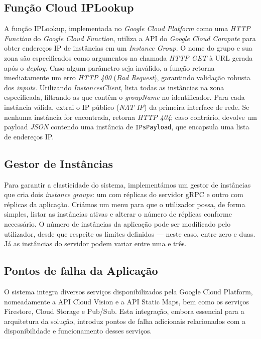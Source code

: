 \subsection{Função Cloud IPLookup}
\label{ssec:cloud_function_iplookup}
A função IPLookup, implementada no \textit{Google Cloud Platform} como uma \textit{HTTP Function} do \textit{Google Cloud Function}, utiliza a API do \textit{Google Cloud Compute} para obter endereços IP de instâncias em um \textit{Instance Group}.
O nome do grupo e sua zona são especificados como argumentos na chamada \textit{HTTP GET} à URL gerada após o \textit{deploy}.
Caso algum parâmetro seja inválido, a função retorna imediatamente um erro \textit{HTTP 400} (\textit{Bad Request}), garantindo validação robusta dos \textit{inputs}.
Utilizando \textit{InstancesClient}, lista todas as instâncias na zona especificada, filtrando as que contêm o \textit{groupName} no identificador.
Para cada instância válida, extrai o IP público (\textit{NAT IP}) da primeira interface de rede.
Se nenhuma instância for encontrada, retorna \textit{HTTP 404}; caso contrário, devolve um payload \textit{JSON} contendo uma instância de \texttt{IPsPayload}, que encapsula uma lista de endereços IP.

\subsection{Gestor de Instâncias}
\label{ssec:instance_manager}
Para garantir a elasticidade do sistema, implementámos um gestor de instâncias que cria dois \textit{instance groups}:
um com réplicas do servidor gRPC e outro com réplicas da aplicação.
Criámos um menu para que o utilizador possa, de forma simples, listar as instâncias ativas e alterar o número de réplicas conforme necessário.
O número de instâncias da aplicação pode ser modificado pelo utilizador, desde que respeite os limites definidos — neste caso, entre zero e duas.
Já as instâncias do servidor podem variar entre uma e três.

\subsection{Pontos de falha da Aplicação}
\label{ssec:application_failure_points}

O sistema integra diversos serviços disponibilizados pela Google Cloud Platform, nomeadamente a API Cloud Vision e a API Static Maps, bem como os serviços Firestore, Cloud Storage e Pub/Sub. Esta integração, embora essencial para a arquitetura da solução, introduz pontos de falha adicionais relacionados com a disponibilidade e funcionamento desses serviços.

